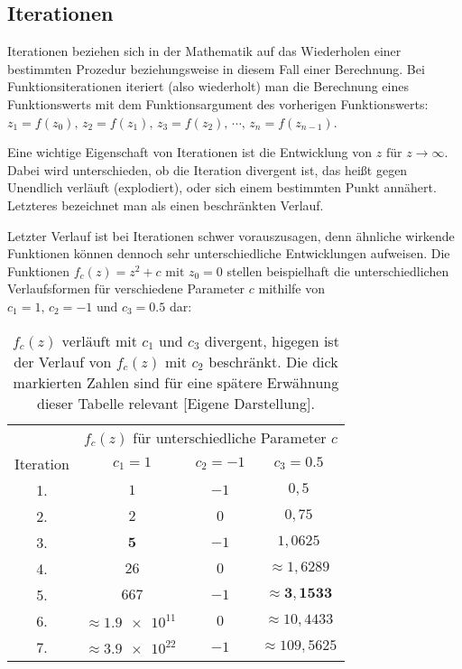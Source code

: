 \subsection{Iterationen}\label{subsec:iterations}

Iterationen beziehen sich in der Mathematik auf das Wiederholen einer bestimmten
Prozedur beziehungsweise in diesem Fall einer Berechnung.
Bei Funktionsiterationen iteriert (also wiederholt) man die Berechnung eines
Funktionswerts mit dem Funktionsargument des vorherigen Funktionswerts:
$z_1 = f(z_0),\, z_2 = f(z_1),\, z_3 = f(z_2),\, \cdots,\, z_n = f(z_{n-1})$.

Eine wichtige Eigenschaft von Iterationen ist die Entwicklung von
$z \text{ für } z \to \infty$.
Dabei wird unterschieden, ob die Iteration divergent ist,
das heißt gegen Unendlich verläuft (\glqq explodiert\grqq),
oder sich einem bestimmten Punkt annähert.
Letzteres bezeichnet man als einen beschränkten Verlauf.

Letzter Verlauf ist bei Iterationen schwer vorauszusagen, denn ähnliche wirkende
Funktionen können dennoch sehr unterschiedliche Entwicklungen aufweisen.
Die Funktionen $f_c(z) = z^2 + c \text{ mit } z_0 = 0$ stellen beispielhaft
die unterschiedlichen Verlaufsformen für verschiedene Parameter $c$ mithilfe von
$c_1 = 1 \text{, } c_2 = -1 \text{ und } c_3 = 0.5$ dar:

\begin{table}[h!]
  \centering
  \begin{tabular}{@{}cccc@{}}
    \toprule
    & \multicolumn{3}{c}{$f_c(z)$ für unterschiedliche Parameter $c$} \\
    \cmidrule(lr){2-4}
    Iteration & $ c_1 = 1$ & $ c_2 = -1$ & $ c_3 = 0.5$ \\
    \midrule
    1. & $1$ & $-1$ & $0,5$ \\
    2. & $2$ & $0$ & $0,75$ \\
    3. & $\boldsymbol{5}$ & $-1$ & $1,0625$ \\
    4. & $26$ & $0$ & $\approx 1,6289 $ \\
    5. & $667$ & $-1$ & $\approx \boldsymbol{3,1533} $ \\
    6. & $\approx \num{1,9e11}\ $ & $0$ & $\approx 10,4433 $ \\
    7. & $\approx \num{3,9e22}\ $ & $-1$ & $\approx 109,5625 $ \\
    \bottomrule
  \end{tabular}
  \caption{
    $f_c(z) \text{ verläuft mit } c_1 \text{ und } c_3$ divergent,
    higegen ist der Verlauf von $f_c(z) \text{ mit } c_2$ beschränkt.
    Die dick markierten Zahlen sind für eine spätere Erwähnung dieser Tabelle
    relevant [Eigene Darstellung].
  }
  \label{tab:iterations-example}
\end{table}